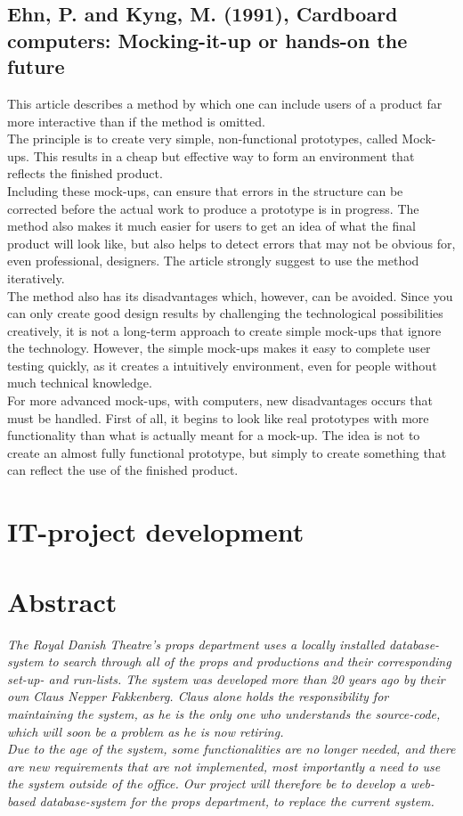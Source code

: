 \documentclass[12pt]{article}
\begin{document}
\subsection*{Ehn, P. and Kyng, M. (1991), Cardboard computers: Mocking-it-up or hands-on the future}
This article describes a method by which one can include users of a product far more interactive than if the method is omitted.\\
The principle is to create very simple, non-functional prototypes, called Mock-ups. This results in a cheap but effective way to form an environment that reflects the finished product. \\
Including these mock-ups, can ensure that errors in the structure can be corrected before the actual work to produce a prototype is in progress. The method also makes it much easier for users to get an idea of what the final product will look like, but also helps to detect errors that may not be obvious for, even professional, designers. The article strongly suggest to use the method iteratively. \\
The method also has its disadvantages which, however, can be avoided. Since you can only create good design results by challenging the technological possibilities creatively, it is not a long-term approach to create simple mock-ups that ignore the technology. However, the simple mock-ups makes it easy to complete user testing quickly, as it creates a intuitively environment, even for people without much technical knowledge.\\
For more advanced mock-ups, with computers, new disadvantages occurs that must be handled. 
First of all, it begins to look like real prototypes with more functionality than what is actually meant for a mock-up. The idea is not to create an almost fully functional prototype, but simply to create something that can reflect the use of the finished product.
\section*{IT-project development}
\section{Abstract}
\textit{The Royal Danish Theatre's props department uses a locally installed database-system to search through all of the props and productions and their corresponding set-up- and run-lists. The system was developed more than 20 years ago by their own Claus Nepper Fakkenberg. Claus alone holds the responsibility for maintaining the system, as he is the only one who understands the source-code, which will soon be a problem as he is now retiring. \\
Due to the age of the system, some functionalities are no longer needed, and there are new requirements that are not implemented, most importantly a need to use the system outside of the office. Our project will therefore be to develop a web-based database-system for the props department, to replace the current system.}
\end{document}
